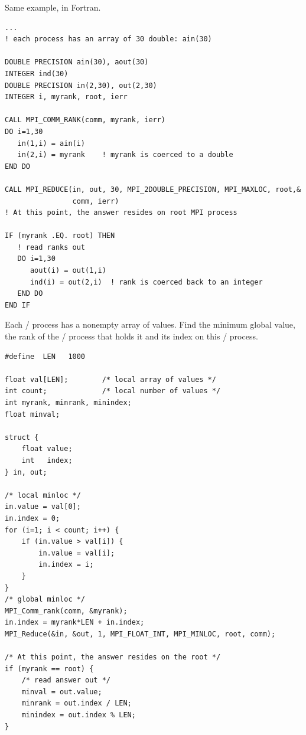 \begin{example}
\label{coll-exminlocF}
%
Same example, in Fortran.

\begin{lstlisting}[language={[MPInoinout]Fortran}]
...
! each process has an array of 30 double: ain(30)

DOUBLE PRECISION ain(30), aout(30)
INTEGER ind(30)
DOUBLE PRECISION in(2,30), out(2,30)
INTEGER i, myrank, root, ierr

CALL MPI_COMM_RANK(comm, myrank, ierr)
DO i=1,30
   in(1,i) = ain(i)
   in(2,i) = myrank    ! myrank is coerced to a double
END DO

CALL MPI_REDUCE(in, out, 30, MPI_2DOUBLE_PRECISION, MPI_MAXLOC, root,&
                comm, ierr)
! At this point, the answer resides on root MPI process

IF (myrank .EQ. root) THEN
   ! read ranks out
   DO i=1,30
      aout(i) = out(1,i)
      ind(i) = out(2,i)  ! rank is coerced back to an integer
   END DO
END IF
\end{lstlisting}
\end{example}




\begin{example}
\label{coll-exminlocC2}
%
Each \MPI/ process has a nonempty array of values.
Find the minimum global value, the rank of the \MPI/ process that holds it
and its index on this \MPI/ process.

\begin{lstlisting}[language={[MPI]C}]
#define  LEN   1000

float val[LEN];        /* local array of values */
int count;             /* local number of values */
int myrank, minrank, minindex;
float minval;

struct {
    float value;
    int   index;
} in, out;

/* local minloc */
in.value = val[0];
in.index = 0;
for (i=1; i < count; i++) {
    if (in.value > val[i]) {
        in.value = val[i];
        in.index = i;
    }
}
/* global minloc */
MPI_Comm_rank(comm, &myrank);
in.index = myrank*LEN + in.index;
MPI_Reduce(&in, &out, 1, MPI_FLOAT_INT, MPI_MINLOC, root, comm);

/* At this point, the answer resides on the root */
if (myrank == root) {
    /* read answer out */
    minval = out.value;
    minrank = out.index / LEN;
    minindex = out.index % LEN;
}
\end{lstlisting}
\end{example}


